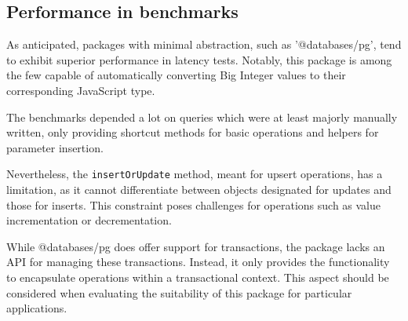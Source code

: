 \subsection*{Performance in benchmarks}
As anticipated, packages with minimal abstraction, such as '@databases/pg', tend
to exhibit superior performance in latency tests. Notably, this package is among
the few capable of automatically converting Big Integer values to their
corresponding JavaScript type.

The benchmarks depended a lot on queries which were at least majorly manually
written, only providing shortcut methods for basic operations and helpers for
parameter insertion.

Nevertheless, the \texttt{insertOrUpdate} method, meant for upsert operations, has a
limitation, as it cannot differentiate between objects designated for updates
and those for inserts. This constraint poses challenges for operations such as
value incrementation or decrementation.

While @databases/pg does offer support for transactions, the package lacks an
API for managing these transactions. Instead, it only provides the functionality
to encapsulate operations within a transactional context. This aspect should be
considered when evaluating the suitability of this package for particular
applications.
